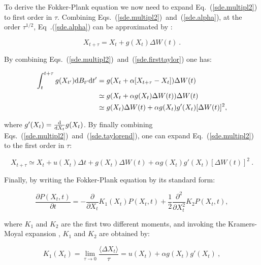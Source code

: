 To derive the Fokker-Plank equation we now need to expand Eq.~(\ref{sde.multipl2}) to first order in $\tau $. Combining Eqs.~(\ref{sde.multipl2})~and~(\ref{sde.alpha}), at the order $\tau^{1/2}$, Eq~.(\ref{sde.alpha}) can be approximated by \cite{sancho_brownian_2011}:

\begin{equation}
	X_{t+\tau} = X_t + g(X_t)\Delta W(t)~.
	\label{sde.firsttaylor}
\end{equation}

By combining Eqs.~(\ref{sde.multipl2})~and~(\ref{sde.firsttaylor}) one has:

\begin{equation}
	\begin{aligned}
		\int_{t}^{t+\tau} g(X_{t'}) \textnormal{d}B_{t'}\textnormal{d}t' &= g(X_t + \alpha[X_{t + \tau} - X_t])\Delta W(t) \\
		&\simeq g(X_t + \alpha g(X_t)\Delta W(t))\Delta W(t)\\
		&\simeq g(X_t) \Delta W(t) + \alpha g(X_t)g'(X_t)[\Delta W(t)]^2,
	\end{aligned}
	\label{sde.taylorend}
\end{equation}

where $g'(X_t) = \frac{\textnormal{d}}{\textnormal{d} X_t} g(X_t) $. By finally combining Eqs.~(\ref{sde.multipl2})~and~(\ref{sde.taylorend}), one can expand Eq.~(\ref{sde.multipl2}) to the first order in $\tau$:

\begin{equation}
	X_{t+\tau } \simeq X_t + u(X_t)\Delta t + g(X_t) \Delta W(t) + \alpha g(X_t)g'(X_t)[\Delta W(t)]^2 ~.
\end{equation}

Finally, by writing the Fokker-Plank equation by its standard form:

\begin{equation}
	\frac{\partial P(X_t, t)}{\partial t} = -\frac{\partial}{\partial X_t} K_1 (X_t) P(X_t, t) + \frac{1}{2}\frac{\partial^2}{\partial X_t^2} K_2P(X_t, t),
\end{equation}

where $K_1$ and $K_2$ are the first two different moments, and invoking the Kramers-Moyal expansion \cite{sancho_brownian_2011, stratonovich_new_1966}, $K_1$ and $K_2$ are obtained by:

\begin{equation}
	K_1(X_t) = \lim\limits_{\tau \rightarrow 0} \frac{\langle \Delta X_t \rangle}{\tau}  = u(X_t) + \alpha g(X_t)g'(X_t)~,
\end{equation}

